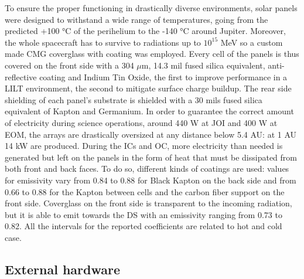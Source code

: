     To ensure the proper functioning in drastically diverse environments, solar panels were designed to withstand a wide range of temperatures, going from the predicted +100 °C of the perihelium to the -140 °C around Jupiter\cite{solar_panels_coef}. Moreover, the whole spacecraft has to survive to radiations up to $10^{15}$ MeV so a custom made CMG coverglass with coating was employed. Every cell of the panels is thus covered on the front side with a 304 $\mu$m, 14.3 mil fused silica equivalent\cite{solar_panels_coef}, anti-reflective coating and Indium Tin Oxide, the first to improve performance in a LILT environment, the second to mitigate surface charge buildup\cite{solar_panels_coef}. The rear side shielding of each panel's substrate is shielded with a 30 mils fused silica equivalent of Kapton and Germanium. In order to guarantee the correct amount of electricity during science operations, around 440 W at JOI and 400 W at EOM, the arrays are drastically oversized at any distance below 5.4 AU: at 1 AU 14 kW are produced. During the ICs and OC, more electricity than needed is generated but left on the panels in the form of heat that must be dissipated from both front and back faces. To do so, different kinds of coatings are used: %
    values for emissivity vary from 0.84 to 0.88 for Black Kapton on the back side and from 0.66 to 0.88 for the Kapton between cells and the carbon fiber support on the front side. Coverglass on the front side is transparent to the incoming radiation, but it is able to emit towards the DS with an emissivity ranging from 0.73 to 0.82. All the intervals for the reported coefficients are related to hot and cold case\cite{solar_panels_coef}.

    
    \subsection{External hardware}
    \label{subsec:external_hardware}

